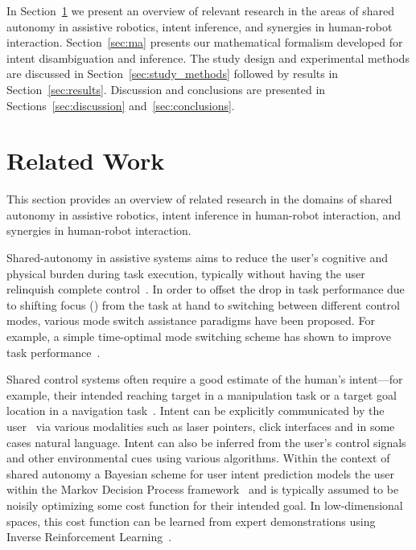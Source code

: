 \documentclass[journal]{IEEEtran}
\begin{document}
In Section~\ref{sec:related-work} we present an overview of relevant research in the areas of shared autonomy in assistive robotics, intent inference, and synergies in human-robot interaction. Section~\ref{sec:ma} presents our mathematical formalism developed for intent disambiguation and inference. The study design and experimental methods are discussed in Section~\ref{sec:study_methods} followed by results in Section~\ref{sec:results}. Discussion and conclusions are presented in Sections~\ref{sec:discussion} and~\ref{sec:conclusions}.


\section{Related Work}\label{sec:related-work}
This section provides an overview of related research in the domains of shared autonomy in assistive robotics, intent inference in human-robot interaction, and synergies in human-robot interaction. 

Shared-autonomy in assistive systems aims to reduce the user's cognitive and physical burden during task execution, typically without having the user relinquish complete control~\cite{philips2007adaptive, demeester2008user, gopinath2017human, muelling2017autonomy}.
In order to offset the drop in task performance due to shifting focus () from the task at hand to switching between different control modes, various mode switch assistance paradigms have been proposed. For example, a simple time-optimal mode switching scheme has shown to improve task performance~\cite{herlant2016assistive, pilarski2012dynamic}. 

Shared control systems often require a good estimate of the human's intent---for example, their intended reaching target in a manipulation task or a target goal location in a navigation task~\cite{liu2016goal}. Intent can be explicitly communicated by the user~\cite{choi2008laser} via various modalities such as laser pointers, click interfaces and in some cases natural language. Intent can also be inferred from the user's control signals and other environmental cues using various algorithms. Within the context of shared autonomy a Bayesian scheme for user intent prediction models the user within the Markov Decision Process framework~\cite{dragan2012formalizing, javdani2017shared, admoni2016predicting} and is typically assumed to be noisily optimizing some cost function for their intended goal. In low-dimensional spaces, this cost function can be learned from expert demonstrations using Inverse Reinforcement Learning~\cite{ziebart2008maximum}. 
\end{document}
